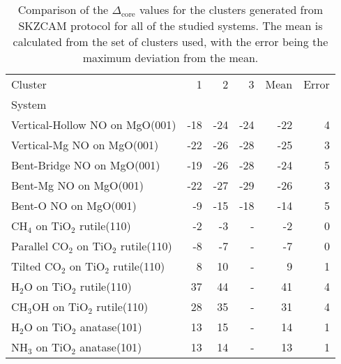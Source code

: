 \begin{table}[h]
\caption{\label{tab:deltacore}Comparison of the $\Delta_\text{core}$ values for the clusters generated from SKZCAM protocol for all of the studied systems. The mean is calculated from the set of clusters used, with the error being the maximum deviation from the mean.}
\begin{adjustbox}{center,max width=1\textwidth}
\begin{tabular}{lrrrrr}
\toprule
Cluster & 1 & 2 & 3 & Mean & Error \\ 
System &  &  &  &  &  \\
\midrule
Vertical-Hollow NO on MgO(001) & -18 & -24 & -24 & -22 & 4 \\
Vertical-Mg NO on MgO(001) & -22 & -26 & -28 & -25 & 3 \\
Bent-Bridge NO on MgO(001) & -19 & -26 & -28 & -24 & 5 \\
Bent-Mg NO on MgO(001) & -22 & -27 & -29 & -26 & 3 \\
Bent-O NO on MgO(001) & -9 & -15 & -18 & -14 & 5 \\
CH$_4$ on TiO$_2$ rutile(110) & -2 & -3 & - & -2 & 0 \\
Parallel CO$_2$ on TiO$_2$ rutile(110) & -8 & -7 & - & -7 & 0 \\
Tilted CO$_2$ on TiO$_2$ rutile(110) & 8 & 10 & - & 9 & 1 \\
H$_2$O on TiO$_2$ rutile(110) & 37 & 44 & - & 41 & 4 \\
CH$_3$OH on TiO$_2$ rutile(110) & 28 & 35 & - & 31 & 4 \\
H$_2$O on TiO$_2$ anatase(101) & 13 & 15 & - & 14 & 1 \\
NH$_3$ on TiO$_2$ anatase(101) & 13 & 14 & - & 13 & 1 \\
\bottomrule
\end{tabular}
\end{adjustbox}
\end{table}
